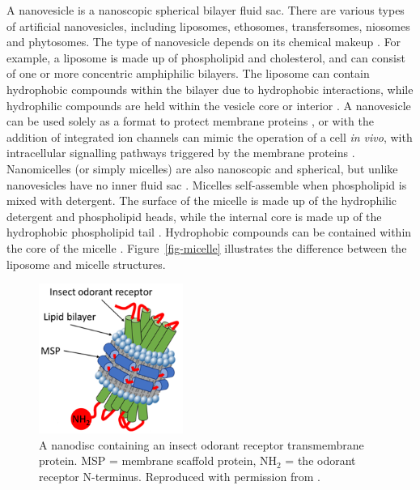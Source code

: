 \documentclass[
  a4paper,
]{scrbook}
\begin{document}
A nanovesicle is a nanoscopic spherical bilayer fluid sac. There are
various types of artificial nanovesicles, including liposomes,
ethosomes, transfersomes, niosomes and phytosomes. The type of
nanovesicle depends on its chemical makeup \autocite{Ramadon2022}. For
example, a liposome is made up of phospholipid and cholesterol, and can
consist of one or more concentric amphiphilic bilayers. The liposome can
contain hydrophobic compounds within the bilayer due to hydrophobic
interactions, while hydrophilic compounds are held within the vesicle
core or interior \autocite{Nath2007,Ramadon2022}. A nanovesicle can be
used solely as a format to protect membrane proteins
\autocite{Murugathas2020}, or with the addition of integrated ion
channels can mimic the operation of a cell \emph{in vivo}, with
intracellular signalling pathways triggered by the membrane proteins
\autocite{Lim2015}. Nanomicelles (or simply micelles) are also
nanoscopic and spherical, but unlike nanovesicles have no inner fluid
sac \autocite{Nath2007,Bose2021}. Micelles self-assemble when
phospholipid is mixed with detergent. The surface of the micelle is made
up of the hydrophilic detergent and phospholipid heads, while the
internal core is made up of the hydrophobic phospholipid tail
\autocite{Nath2007}. Hydrophobic compounds can be contained within the
core of the micelle \autocite{Bose2021}. Figure~\ref{fig-micelle}
illustrates the difference between the liposome and micelle structures.

\begin{figure}

{\centering \includegraphics[width=0.42\textwidth,height=\textheight]{figures/ch3/iOR_nanodisc.png}

}

\caption{\label{fig-msp-iOR-nanodisc}A nanodisc containing an insect
odorant receptor transmembrane protein. MSP = membrane scaffold protein,
NH\(_2\) = the odorant receptor N-terminus. Reproduced with permission
from \autocite{Murugathas2019a}.}

\end{figure}
\end{document}
